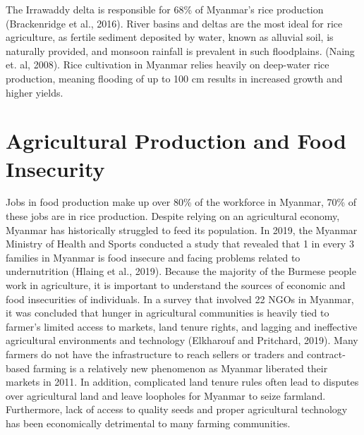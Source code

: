 \documentclass{book}\usepackage{knitr}
\begin{document}
The Irrawaddy delta is responsible for 68\% of Myanmar’s rice production (Brackenridge et al., 2016). River basins and deltas are the most ideal for rice agriculture, as fertile sediment deposited by water, known as alluvial soil, is naturally provided, and monsoon rainfall is prevalent in such floodplains. (Naing et. al, 2008). Rice cultivation in Myanmar relies heavily on deep-water rice production, meaning flooding of up to 100 cm results in increased growth and higher yields.
 
\section{Agricultural Production and Food Insecurity}
Jobs in food production make up over 80\% of the workforce in Myanmar, 70\% of these jobs are in rice production. Despite relying on an agricultural economy, Myanmar has historically struggled to feed its population. In 2019, the Myanmar Ministry of Health and Sports conducted a study that revealed that 1 in every 3 families in Myanmar is food insecure and facing problems related to undernutrition (Hlaing et al., 2019). Because the majority of the Burmese people work in agriculture, it is important to understand the sources of economic and food insecurities of individuals. In a survey that involved 22 NGOs in Myanmar, it was concluded that hunger in agricultural communities is heavily tied to farmer’s limited access to markets, land tenure rights, and lagging and ineffective agricultural environments and technology (Elkharouf and Pritchard, 2019). Many farmers do not have the infrastructure to reach sellers or traders and contract-based farming is a relatively new phenomenon as Myanmar liberated their markets in 2011. In addition, complicated land tenure rules often lead to disputes over agricultural land and leave loopholes for Myanmar to seize farmland. Furthermore, lack of access to quality seeds and proper agricultural technology has been economically detrimental to many farming communities. 
\end{document}
